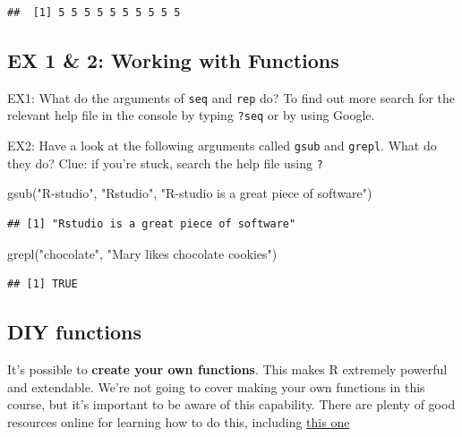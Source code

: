 \documentclass[]{article}
\newenvironment{Shaded}{\begin{snugshade}}{\end{snugshade}}
\newcommand{\FunctionTok}[1]{\textcolor[rgb]{0.00,0.00,0.00}{#1}}
\newcommand{\NormalTok}[1]{#1}
\newcommand{\StringTok}[1]{\textcolor[rgb]{0.31,0.60,0.02}{#1}}
\begin{document}
\begin{verbatim}
##  [1] 5 5 5 5 5 5 5 5 5 5
\end{verbatim}

\hypertarget{ex-1-2-working-with-functions}{%
\subsection{EX 1 \& 2: Working with
Functions}\label{ex-1-2-working-with-functions}}

EX1: What do the arguments of \texttt{seq} and \texttt{rep} do? To find
out more search for the relevant help file in the console by typing
\texttt{?seq} or by using Google.

EX2: Have a look at the following arguments called \texttt{gsub} and
\texttt{grepl}. What do they do? Clue: if you're stuck, search the help
file using \texttt{?}

\begin{Shaded}
\begin{Highlighting}[]
\FunctionTok{gsub}\NormalTok{(}\StringTok{"R{-}studio"}\NormalTok{, }\StringTok{"Rstudio"}\NormalTok{, }\StringTok{"R{-}studio is a great piece of software"}\NormalTok{)}
\end{Highlighting}
\end{Shaded}

\begin{verbatim}
## [1] "Rstudio is a great piece of software"
\end{verbatim}

\begin{Shaded}
\begin{Highlighting}[]
\FunctionTok{grepl}\NormalTok{(}\StringTok{"chocolate"}\NormalTok{, }\StringTok{"Mary likes chocolate cookies"}\NormalTok{)}
\end{Highlighting}
\end{Shaded}

\begin{verbatim}
## [1] TRUE
\end{verbatim}

\hypertarget{diy-functions}{%
\subsection{DIY functions}\label{diy-functions}}

It's possible to \textbf{create your own functions}. This makes R
extremely powerful and extendable. We're not going to cover making your
own functions in this course, but it's important to be aware of this
capability. There are plenty of good resources online for learning how
to do this, including
\href{https://www.statmethods.net/management/userfunctions.html}{this
one}
\end{document}

